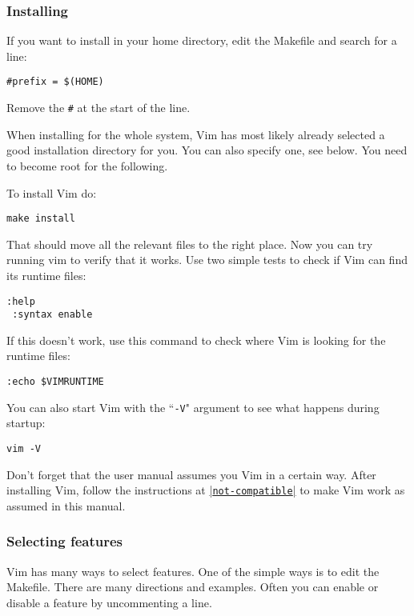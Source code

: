 \subsubsection{Installing}
\label{install-home}
If you want to install in your home directory, edit the Makefile and search for a line:

\begin{Verbatim}[samepage=true]
    #prefix = $(HOME)
\end{Verbatim}

Remove the \texttt{\#} at the start of the line.

When installing for the whole system, Vim has most likely already selected a good installation directory for you.
You can also specify one, see below.
You need to become root for the following.

To install Vim do:

\begin{Verbatim}[samepage=true]
 make install
\end{Verbatim}

That should move all the relevant files to the right place.
Now you can try running vim to verify that it works.
Use two simple tests to check if Vim can find its runtime files:

\begin{Verbatim}[samepage=true]
 :help
 :syntax enable
\end{Verbatim}

If this doesn't work, use this command to check where Vim is looking for the runtime files:

\begin{Verbatim}[samepage=true]
 :echo $VIMRUNTIME
\end{Verbatim}

You can also start Vim with the ``\texttt{-V}" argument to see what happens during startup:

\begin{Verbatim}[samepage=true]
 vim -V
\end{Verbatim}

Don't forget that the user manual assumes you Vim in a certain way.
After installing Vim, follow the instructions at \hyperref[not-compatible]{|\texttt{not-compatible}|} to make Vim work as assumed in this manual.

\subsubsection{Selecting features}
Vim has many ways to select features.
One of the simple ways is to edit the Makefile.
There are many directions and examples.
Often you can enable or disable a feature by uncommenting a line.

